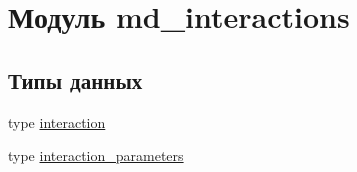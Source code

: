 \hypertarget{namespacemd__interactions}{}\section{Модуль md\+\_\+interactions}
\label{namespacemd__interactions}
\subsection*{Типы данных}
\begin{DoxyCompactItemize}
\item 
type \mbox{\hyperlink{structmd__interactions_1_1interaction}{interaction}}
\item 
type \mbox{\hyperlink{structmd__interactions_1_1interaction__parameters}{interaction\+\_\+parameters}}
\end{DoxyCompactItemize}
